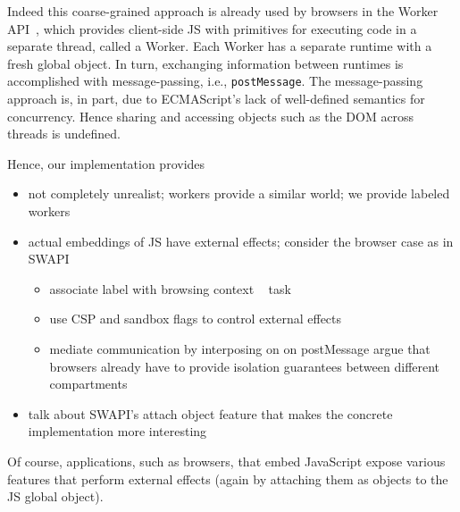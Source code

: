 Indeed this coarse-grained approach is already used by browsers in the
Worker API~\tocite{}, which provides client-side JS with primitives
for executing code in a separate thread, called a Worker.
%
Each Worker has a separate runtime with a fresh global object.
%
In turn, exchanging information between runtimes is accomplished with
message-passing, i.e., \texttt{postMessage}.
%
The message-passing approach is, in part, due to ECMAScript's lack
of well-defined semantics for concurrency.
%
Hence sharing and accessing objects such as the DOM across threads is
undefined.
%

Hence, our implementation provides 

\begin{itemize}
\item not completely unrealist; workers provide a similar world; we
  provide labeled workers

\item actual embeddings of JS have external effects; consider the browser
  case as in SWAPI
\begin{itemize}
   \item associate label with browsing context ~ task
   \item use CSP and sandbox flags to control external effects
   \item mediate communication by interposing on on postMessage
   argue that browsers already have to provide isolation guarantees
   between different compartments
\end{itemize}

\item talk about SWAPI's attach object feature that makes the concrete
  implementation more interesting
\end{itemize}


Of course, applications, such as browsers, that embed JavaScript
expose various features that perform external effects (again by
attaching them as objects to the JS global object).
%







